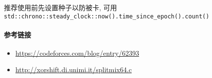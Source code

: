 推荐使用前先设置种子以防被卡, 可用\\\verb|std::chrono::steady_clock::now().time_since_epoch().count()|

\paragraph{参考链接}

\begin{itemize}
    \item \url{https://codeforces.com/blog/entry/62393}
    \item \url{http://xorshift.di.unimi.it/splitmix64.c}
\end{itemize}